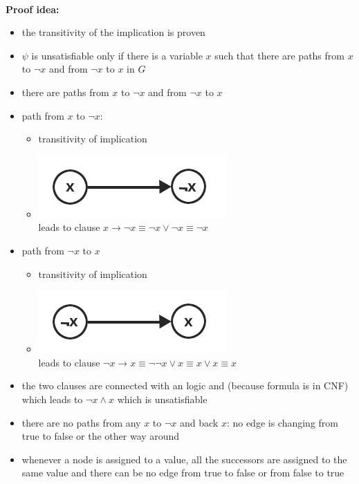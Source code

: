 \documentclass[a4]{scrartcl}
\begin{document}
\ \\
\textbf{Proof idea:}
\begin{itemize}
\item the transitivity of the implication is proven
\item $\psi$ is unsatisfiable only if there is a variable $x$ such that there are paths from $x$ to $\neg x$ and from $\neg x$ to $x$ in $G$ \\

\item there are paths from $x$ to $\neg x$ and from $\neg x$ to $x$
\item path from $x$ to $\neg x$:
\begin{itemize}
\item transitivity of implication
\item[] \includegraphics[scale=0.4]{graph_2.png}  \\
leads to clause $x \rightarrow \neg x \equiv \neg x \lor \neg x \equiv \neg x$
\end{itemize}

\item path from $\neg x$ to $x$
\begin{itemize}
\item transitivity of implication
\item[] \includegraphics[scale=0.4]{graph_1.png}  \\
leads to clause $\neg x \rightarrow x \equiv \neg \neg x \lor x \equiv x \lor x \equiv x$
\end{itemize}

\item the two clauses are connected with an logic and (because formula is in CNF) which leads to $\neg x \land x$ which is unsatisfiable
\\

\item there are no paths from any $x$ to $\neg x$ and back $x$: no edge is changing from true to false or the other way around
\item whenever a node is assigned to a value, all the successors are assigned to the same value and there can be no edge from true to false or from false to true

\end{itemize}
\end{document}
